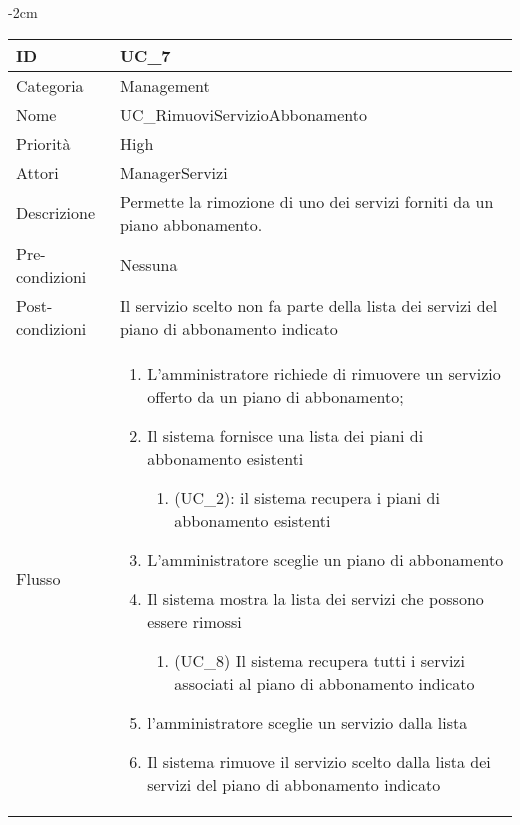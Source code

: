 \begin{center}
\begin{table}[bp]
    \centering
    \addtolength{\leftskip} {-2cm}
\begin{tabular}{ |p{2.6cm}|p{13cm}|  }
\hline
ID & UC\_7 \\\hline
Categoria & Management\\\hline
Nome & UC\_RimuoviServizioAbbonamento\\\hline
Priorità & High \\\hline
Attori &  ManagerServizi \\\hline
Descrizione & Permette la rimozione di uno dei servizi forniti da un piano abbonamento.\\\hline
Pre-condizioni &  Nessuna \\\hline
Post-condizioni &  Il servizio scelto non fa parte della lista dei servizi del piano di abbonamento indicato\\\hline
Flusso &  	\vspace{-5mm} \begin{enumerate}
		\item L'amministratore richiede di rimuovere un servizio offerto da un piano di abbonamento;
		\item Il sistema fornisce una lista dei piani di abbonamento esistenti
		\begin{enumerate}[  ]
			\item (UC\_2): il sistema recupera i piani di abbonamento esistenti
		\end{enumerate}
		\item L'amministratore sceglie un piano di abbonamento
		\item Il sistema mostra la lista dei servizi che possono essere rimossi		
			\begin{enumerate}[label*=\arabic*.]
			\item (UC\_8) Il sistema recupera tutti i servizi associati al piano di abbonamento indicato
			\end{enumerate}
		\item l'amministratore sceglie un servizio dalla lista
		\item Il sistema rimuove il servizio scelto dalla lista dei servizi del piano di abbonamento indicato
		\end{enumerate}\\\hline
\end{tabular}
\label{table_use_case:7}\newline
\end{table}


\end{center}
